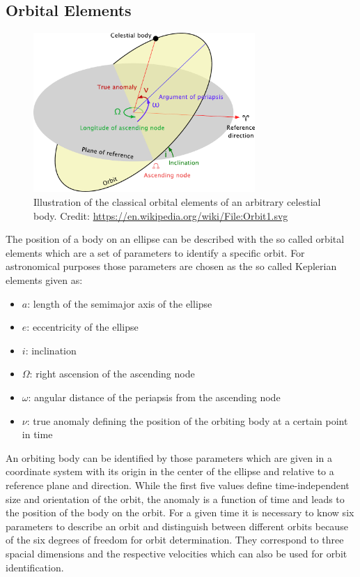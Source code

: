 \documentclass[11pt, a4paper]{article}
\numberwithin{equation}{section}
\begin{document}
\subsection{Orbital Elements}
\label{sec:orbital_elements}
\begin{figure}[h]
	\centering
	\includegraphics[width=0.75\textwidth]{./figures/orbital_elements.pdf}
	\caption{Illustration of the classical orbital elements of an arbitrary celestial body. Credit: \url{https://en.wikipedia.org/wiki/File:Orbit1.svg}}
\end{figure}
The position of a body on an ellipse can be described with the so called orbital elements which are a set of parameters to identify a specific orbit.
For astronomical purposes those parameters are chosen as the so called Keplerian elements given as:
\begin{itemize}
	\item $a$: length of the semimajor axis of the ellipse	
	\item $e$: eccentricity of the ellipse	
	\item $i$: inclination	
	\item $\Omega$: right ascension of the ascending node	
	\item $\omega$: angular distance of the periapsis from the ascending node	
	\item $\nu$: true anomaly defining the position of the orbiting body at a certain point in time
\end{itemize}
An orbiting body can be identified by those parameters which are given in a coordinate system with its origin in the center of the ellipse and relative to a reference plane and direction.
While the first five values define time-independent size and orientation of the orbit, the anomaly is a function of time and leads to the position of the body on the orbit.
For a given time it is necessary to know six parameters to describe an orbit and distinguish between different orbits because of the six degrees of freedom for orbit determination.
They correspond to three spacial dimensions and the respective velocities which can also be used for orbit identification.
\end{document}
